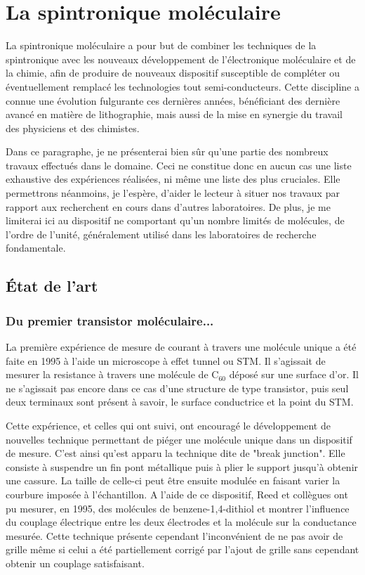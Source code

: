 \section{La spintronique moléculaire}
La spintronique moléculaire a pour but de combiner les techniques de la spintronique avec les nouveaux développement de l'électronique moléculaire et de la chimie, afin de produire de nouveaux dispositif susceptible de compléter ou éventuellement remplacé les technologies tout semi-conducteurs. Cette discipline a connue une évolution fulgurante ces dernières années, bénéficiant des dernière avancé en matière de lithographie, mais aussi de la mise en synergie du travail des physiciens et des chimistes. 

Dans ce paragraphe, je ne présenterai bien sûr qu'une partie des nombreux travaux effectués dans le domaine. Ceci ne constitue donc en aucun cas une liste exhaustive des expériences réalisées, ni m\^eme une liste des plus cruciales. Elle permettrons néanmoins, je l'espère, d'aider le lecteur à situer nos travaux par rapport aux recherchent en cours dans d'autres laboratoires. De plus, je me limiterai ici au dispositif ne comportant qu'un nombre limités de molécules, de l'ordre de l'unité, généralement utilisé dans les laboratoires de recherche fondamentale.
\subsection{État de l'art}

\subsubsection*{Du premier transistor moléculaire...}
La première expérience de mesure de courant à travers une molécule unique a été faite en 1995 à l'aide un microscope à effet tunnel ou STM. Il s'agissait de mesurer la resistance à travers une molécule de C$_{60}$ déposé sur une surface d'or. Il ne s'agissait pas encore dans ce cas d'une structure de type transistor, puis seul deux terminaux sont présent à savoir, le surface conductrice et la point du STM.

Cette expérience, et celles qui ont suivi, ont encouragé le développement de nouvelles technique permettant de piéger une molécule unique dans un dispositif de mesure. C'est ainsi qu'est apparu la technique dite de "break junction". Elle consiste à suspendre un fin pont métallique puis à plier le support jusqu'à obtenir une cassure. La taille de celle-ci peut être ensuite modulée en faisant varier la courbure imposée à l'échantillon. A l'aide de ce dispositif, Reed et collègues ont pu mesurer, en 1995, des molécules de benzene-1,4-dithiol et montrer l'influence du couplage électrique entre les deux électrodes et la molécule sur la conductance mesurée. Cette technique présente cependant l'inconvénient de ne pas avoir de grille m\^eme si celui a été partiellement corrigé par l'ajout de grille sans cependant obtenir un couplage satisfaisant.


